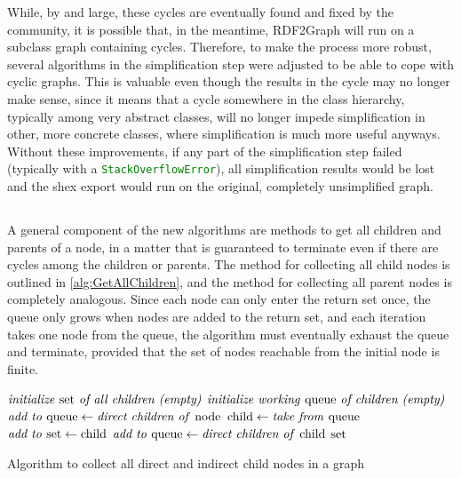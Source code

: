 While, by and large, these cycles are eventually found and fixed by the community,
it is possible that, in the meantime, \gls{RDF2Graph} will run on a subclass graph containing cycles.
Therefore, to make the process more robust,
several algorithms in the simplification step were adjusted to be able to cope with cyclic graphs.
This is valuable even though the results in the cycle may no longer make sense,
since it means that a cycle somewhere in the class hierarchy,
typically among very abstract classes,
will no longer impede simplification in other, more concrete classes,
where simplification is much more useful anyways.
Without these improvements,
if any part of the simplification step failed
(typically with a \lstinline[language=java]{StackOverflowError}),
all simplification results would be lost
and the \gls{shex} export would run on the original, completely unsimplified graph.

\subsection{}
\label{subsec:RDF2Graph+Wikidata:cyclic-graphs:GetAllChildren}

A general component of the new algorithms are methods to get all children and parents of a node,
in a matter that is guaranteed to terminate even if there are cycles among the children or parents.
The method for collecting all child nodes is outlined in \cref{alg:GetAllChildren},
and the method for collecting all parent nodes is completely analogous.
Since each node can only enter the return set once,
the queue only grows when nodes are added to the return set,
and each iteration takes one node from the queue,
the algorithm must eventually exhaust the queue and terminate,
provided that the set of nodes reachable from the initial node is finite.

\begin{algorithm}
  \begin{algorithmic}
    \State $\text{\textit{initialize \textup{set} of all children (empty)}}$
    \State $\text{\textit{initialize working \textup{queue} of children (empty)}}$
    \State $\text{\textit{add to \textup{queue}}} \gets \text{\textit{direct children of \textup{node}}}$
    \State $\textup{child} \gets \text{\textit{take from \textup{queue}}}$
    \State $\text{\textit{add to \textup{set}}} \gets \textup{child}$
    \State $\text{\textit{add to \textup{queue}}} \gets \text{\textit{direct children of \textup{child}}}$
    \EndIf
    \EndWhile
    \State \Return $\text{\textit{\textup{set}}}$
    \EndFunction
  \end{algorithmic}
  \caption{Algorithm to collect all direct and indirect child nodes in a graph}
  \label{alg:GetAllChildren}
\end{algorithm}

